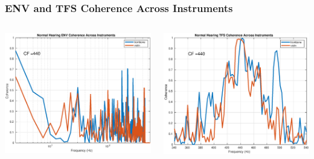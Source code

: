 \documentclass[aspectratio=1610]{beamer}
\begin{document}
\begin{frame}

\frametitle{ENV and TFS Coherence Across Instruments}

\begin{columns}
\begin{column}{0.55\textwidth}
\includegraphics[scale = .4]{trombone_violin_ENV_coherence_440}
\end{column}
\begin{column}{0.56\textwidth}
\includegraphics[scale = .4]{trombone_violin_TFS_coherence_440}
\end{column}
\end{columns}
\end{frame}
\end{document}
